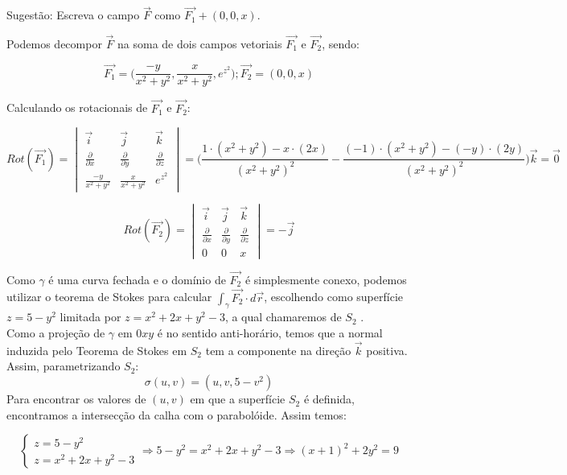 \documentclass[12pt,a4paper]{article}
\begin{document}
Sugestão: Escreva o campo $\vec{F}$ como $\vec{F_1} + (0,0,x)$.


Podemos decompor $\vec{F}$ na soma de dois campos vetoriais $\vec{F_1}$ e $\vec{F_2}$, sendo:

$$ \vec{F_1} =  \Big( \frac{-y}{x^2 + y^2}, \frac{x}{x^2 + y^2}, e^{z^2} \Big) ; \vec{F_2} = ( 0, 0, x ) $$

Calculando os rotacionais de $\vec{F_1}$ e $\vec{F_2}$:

$$ \displaystyle Rot(\vec{F_1}) =
\begin{vmatrix}
\vec{i} & \vec{j} & \vec{k} \\
\frac{\partial}{\partial x} & \frac{\partial}{\partial y} & \frac{\partial}{\partial z}  \\
\frac{-y}{x^2 + y^2}  & \frac{x}{x^2 + y^2} & e^{z^2}
\end{vmatrix} 
= \Big( \frac{1 \cdot (x^2 + y^2) - x \cdot (2x)}{(x^2 + y^2)^2} - \frac{(-1) \cdot (x^2 + y^2) - (-y) \cdot (2y)}{(x^2 + y^2)^2} \Big) \vec{k} = \vec{0} $$

$$ Rot(\vec{F_2}) =
\begin{vmatrix} \vec{i} & \vec{j} & \vec{k} \\
\frac{\partial}{\partial x} & \frac{\partial}{\partial y} & \frac{\partial}{\partial z}  \\
0 & 0 & x
\end{vmatrix} = -\vec{j} $$

Como $\gamma$ é uma curva fechada e o domínio de $\vec{F_2}$ é simplesmente conexo, podemos utilizar o teorema de Stokes para calcular $ \displaystyle \int_{\gamma} \vec{F_2} \cdot d\vec{r} $, escolhendo como superfície  $z = 5 - y^2$ limitada por $z = x^2 + 2x + y^2 -3$, a qual chamaremos de $S_2$ . \\

Como a projeção de $\gamma $ em $0xy$ é no sentido anti-horário, temos que a normal induzida pelo Teorema de Stokes em $S_2$ tem a componente na direção $\vec{k}$ positiva. Assim, parametrizando $S_2$:
$$ \sigma (u,v) = (u,v, 5-v^2) $$
Para encontrar os valores de $(u,v)$ em que a superfície $S_2$ é definida, encontramos a intersecção da calha com o parabolóide. Assim temos:

$$\begin{cases}
z = 5 - y^2 \\
z = x^2 + 2x + y^2 - 3
\end{cases}
\Rightarrow
5 - y^2 = x^2 + 2x + y^2 - 3 \Rightarrow (x+1)^2 + 2y^2 = 9 $$
\end{document}
